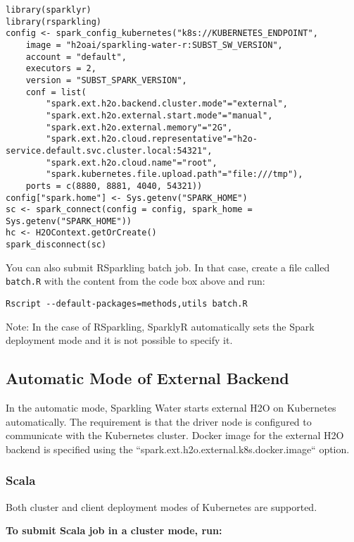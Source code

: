 \begin{lstlisting}[style=R]
library(sparklyr)
library(rsparkling)
config <- spark_config_kubernetes("k8s://KUBERNETES_ENDPOINT",
    image = "h2oai/sparkling-water-r:SUBST_SW_VERSION",
    account = "default",
    executors = 2,
    version = "SUBST_SPARK_VERSION",
    conf = list(
        "spark.ext.h2o.backend.cluster.mode"="external",
        "spark.ext.h2o.external.start.mode"="manual",
        "spark.ext.h2o.external.memory"="2G",
        "spark.ext.h2o.cloud.representative"="h2o-service.default.svc.cluster.local:54321",
        "spark.ext.h2o.cloud.name"="root",
        "spark.kubernetes.file.upload.path"="file:///tmp"),
    ports = c(8880, 8881, 4040, 54321))
config["spark.home"] <- Sys.getenv("SPARK_HOME")
sc <- spark_connect(config = config, spark_home = Sys.getenv("SPARK_HOME"))
hc <- H2OContext.getOrCreate()
spark_disconnect(sc)
\end{lstlisting}


You can also submit RSparkling batch job. In that case, create a file called \texttt{batch.R} with the content
from the code box above and run:

\begin{lstlisting}[style=Bash]
Rscript --default-packages=methods,utils batch.R
\end{lstlisting}

Note: In the case of RSparkling, SparklyR automatically sets the Spark deployment mode and it is not possible to specify it.

\subsection{Automatic Mode of External Backend}

In the automatic mode, Sparkling Water starts external H2O on Kubernetes automatically. The requirement is that the
driver node is configured to communicate with the Kubernetes cluster. Docker image for the external H2O backend
is specified using the ``spark.ext.h2o.external.k8s.docker.image`` option.

\subsubsection{Scala}

Both cluster and client deployment modes of Kubernetes are supported.

\textbf{To submit Scala job in a cluster mode, run:}

